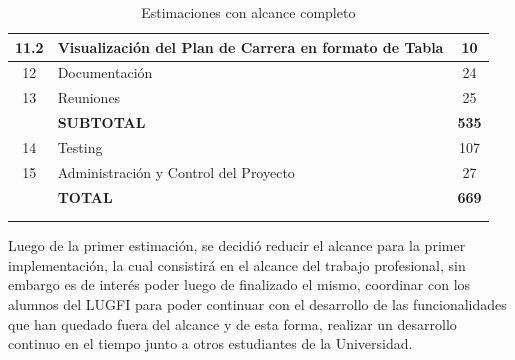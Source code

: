 \documentclass[a4paper]{article}
\begin{document}
\begin{longtable}{| c | l | c |}
\hline
11.2				&	Visualización del Plan de Carrera en formato de Tabla			&	10\\
\hline
12					&	Documentación													&	24\\
\hline
13					&	Reuniones														&	25\\
\hline
					&	\textbf{SUBTOTAL}												&	\textbf{535}\\
\hline
14					&	Testing															&	107\\
\hline
15					&	Administración y Control del Proyecto							&	27\\
\hline
					&	\textbf{TOTAL}													&	\textbf{669}\\
\hline
\\ %
\caption{Estimaciones con alcance completo}
\label{ta:estimaciones_alcance_completo}
\end{longtable}


Luego de la primer estimación, se decidió reducir el alcance para la primer implementación, la cual consistirá en el alcance del trabajo profesional, sin embargo es de interés poder luego de finalizado el mismo, coordinar con los alumnos del LUGFI para poder continuar con el desarrollo de las funcionalidades que han quedado fuera del alcance y de esta forma, realizar un desarrollo continuo en el tiempo junto a otros estudiantes de la Universidad.
\end{document}
